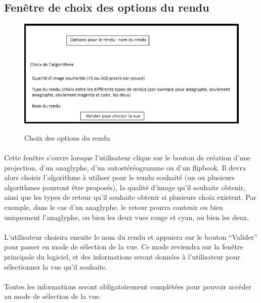 \subsection{Fenêtre de choix des options du rendu}

\begin{figure}[h]
  \centering
  \includegraphics[scale=0.6]{choixoptionsrendu}
  \label{fig:optionsrendu}
  \caption{Choix des options du rendu}
\end{figure}

\paragraph{}
Cette fenêtre s’ouvre lorsque l’utilisateur clique sur le bouton de création d’une projection, d’un anaglyphe, d’un autostéréogramme ou d’un flipbook. Il devra alors choisir l’algorithme à utiliser pour le rendu souhaité (un ou plusieurs algorithmes pourront être proposés), la qualité d’image qu’il souhaite obtenir, ainsi que les types de retour qu’il souhaite obtenir si plusieurs choix existent. Par exemple, dans le cas d’un anaglyphe, le retour pourra contenir ou bien uniquement l’anaglyphe, ou bien les deux vues rouge et cyan, ou bien les deux.

\paragraph{}
L’utilisateur choisira ensuite le nom du rendu et appuiera sur le bouton ``Valider'' pour passer en mode de sélection de la vue. Ce mode reviendra sur la fenêtre principale du logiciel, et des informations seront données à l’utilisateur pour sélectionner la vue qu’il souhaite.

\paragraph{}
Toutes les informations seront obligatoirement complétées pour pouvoir accéder au mode de sélection de la vue.

